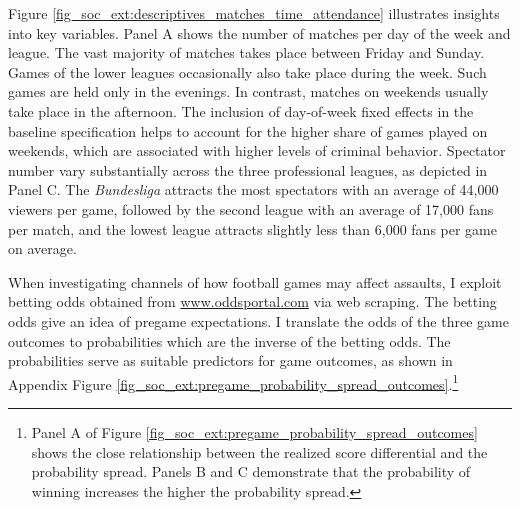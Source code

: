 Figure \ref{fig_soc_ext:descriptives_matches_time_attendance} illustrates insights into key variables. Panel A shows the number of matches per day of the week and league. The vast majority of matches takes place between Friday and Sunday. Games of the lower leagues occasionally also take place during the week. Such games are held only in the evenings. In contrast, matches on weekends usually take place in the afternoon. The inclusion of day-of-week fixed effects in the baseline specification helps to account for the higher share of games played on weekends, which are associated with higher levels of criminal behavior. Spectator number vary substantially across the three professional leagues, as depicted in Panel C. The \textit{Bundesliga} attracts the most spectators with an average of 44,000 viewers per game, followed by the second league with an average of 17,000 fans per match, and the lowest league attracts slightly less than 6,000 fans per game on average.


\afterpage{


}


When investigating channels of how football games may affect assaults, I exploit betting odds obtained from \url{www.oddsportal.com} via web scraping. The betting odds give an idea of pregame expectations. I translate the odds of the three game outcomes to probabilities which are the inverse of the betting odds. The probabilities serve as suitable predictors for game outcomes, as shown in Appendix Figure \ref{fig_soc_ext:pregame_probability_spread_outcomes}.\footnote{Panel A of Figure \ref{fig_soc_ext:pregame_probability_spread_outcomes} shows the close relationship between the realized score differential and the probability spread. Panels B and C demonstrate that the probability of winning increases the higher the probability spread.}



